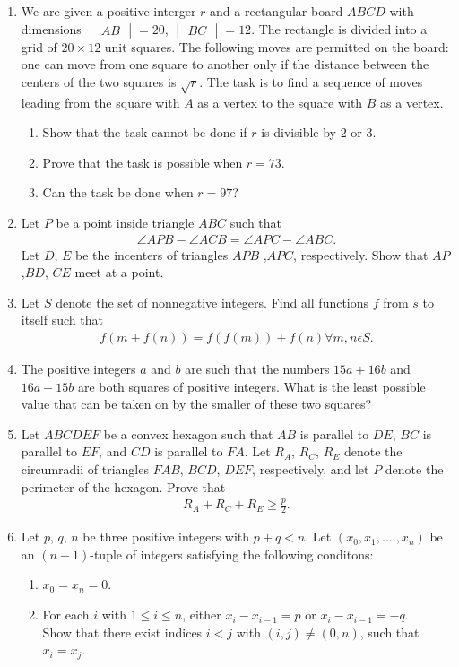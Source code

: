 \documentclass[12pt,-letter paper]{article}
\providecommand{\mydet}[1]{\ensuremath{\begin{vmatrix}#1\end{vmatrix}}}
\begin{document}
\begin{enumerate}
	\item  We are given a positive interger $r$ and a rectangular board $ABCD$ with dimensions $\mydet{AB} =20$, $\mydet{BC}=12$. The rectangle is divided into a grid of \(20\times12\) unit squares. The following moves are permitted on the board: one can move from one square to another only if the distance between the centers of the two squares is $\sqrt{r}$. The task is to find a sequence of moves leading from the square with $A$ as a vertex to the square with $B$ as a vertex.
\begin{enumerate}
\item Show that the task cannot be done if $r$ is divisible by $2$ or $3$.
\item Prove that the task is possible when $r=73$.
\item Can the task be done when $r=97$?
\end{enumerate}
\item Let $P$ be a point inside triangle $ABC$ such that
	\begin{align*}
\angle{APB}-\angle{ACB}=\angle{APC}-\angle{ABC}.
	\end{align*}
Let $D$, $E$ be the incenters of triangles $APB$ ,$APC$, respectively. Show that $AP$ ,$BD$, $CE$ meet at a point.
\item Let $S$ denote the set of nonnegative integers. Find all functions $f$ from $s$ to itself such that 
	\begin{align*}
		f(m+f(n))=f(f(m))+f(n)         
		\forall{m}, n \epsilon S. 
	\end{align*}
\item The positive integers $a$ and $b$ are such that the numbers $15a+16b$ and $16a-15b$ are both squares of positive integers. What is the least possible value that can be taken on by the smaller of these two squares?
\item Let $ABCDEF$ be a convex hexagon such that $AB$ is parallel to $DE$, $BC$ is parallel to $EF$, and $CD$ is parallel to $FA$. Let $R_A$, $R_C$, $R_E$ denote the circumradii of triangles $FAB$, $BCD$, $DEF$, respectively, and let $P$ denote the perimeter of the hexagon. Prove that
	\begin{align*}
		R_A+R_C+R_E\geq\frac{p}{2}.
	\end{align*}
\item Let $p$, $q$, $n$ be three positive integers with $p+q<n$. Let $(x_0, x_1,....,x_n)$ be an $(n+1)$-tuple of integers satisfying the following conditons:
	\begin{enumerate}
\item $x_0=x_n=0$.
\item For each $i$ with $1\leq{i}\leq{n}$, either $x_i-x_{i-1}=p$ or $x_i-x_{i-1}=-q$.\\ 
Show that there exist indices $i < j$ with $(i,j) \neq(0,n)$, such that $x_i=x_j$.
	\end{enumerate}
\end{enumerate}
    
\end{document}
